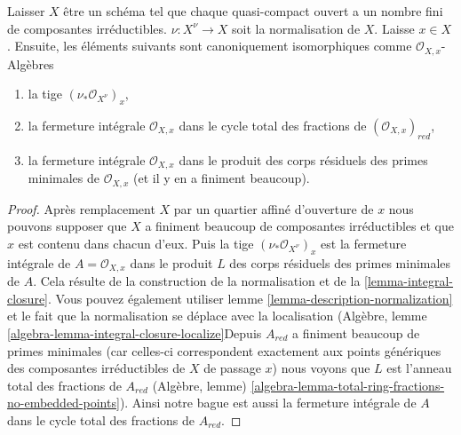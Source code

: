 \begin{lemma}

\label{lemma-stalk-normalization}

Laisser $X$ être un schéma tel que chaque quasi-compact ouvert a un nombre fini de composantes irréductibles. $\nu : X^\nu \to X$
soit la normalisation de $X$. Laisse $x \in X$. Ensuite, les éléments suivants sont canoniquement isomorphiques comme $\mathcal{O}_{X, x}$-Algèbres

\begin{enumerate}

\item la tige $(\nu_*\mathcal{O}_{X^\nu})_x$,
\item la fermeture intégrale $\mathcal{O}_{X, x}$ dans le cycle total des fractions de $(\mathcal{O}_{X, x})_{red}$,
\item la fermeture intégrale $\mathcal{O}_{X, x}$ dans le produit des corps résiduels des primes minimales de $\mathcal{O}_{X, x}$
(et il y en a finiment beaucoup).

\end{enumerate}

\end{lemma}

\begin{proof}

Après remplacement $X$ par un quartier affiné d'ouverture de $x$ nous pouvons supposer que $X$ a finiment beaucoup de composantes irréductibles et que $x$ est contenu dans chacun d'eux. Puis la tige $(\nu_*\mathcal{O}_{X^\nu})_x$ est la fermeture intégrale de $A = \mathcal{O}_{X, x}$ dans le produit $L$
des corps résiduels des primes minimales de $A$. Cela résulte de la construction de la normalisation et de la \ref{lemma-integral-closure}. Vous pouvez également utiliser lemme
\ref{lemma-description-normalization}
et le fait que la normalisation se déplace avec la localisation (Algèbre, lemme \ref{algebra-lemma-integral-closure-localize}Depuis $A_{red}$ a finiment beaucoup de primes minimales (car celles-ci correspondent exactement aux points génériques des composantes irréductibles de $X$ de passage $x$) nous voyons que $L$ est l'anneau total des fractions de $A_{red}$
(Algèbre, lemme) \ref{algebra-lemma-total-ring-fractions-no-embedded-points}). Ainsi notre bague est aussi la fermeture intégrale de $A$ dans le cycle total des fractions de $A_{red}$.

\end{proof}

